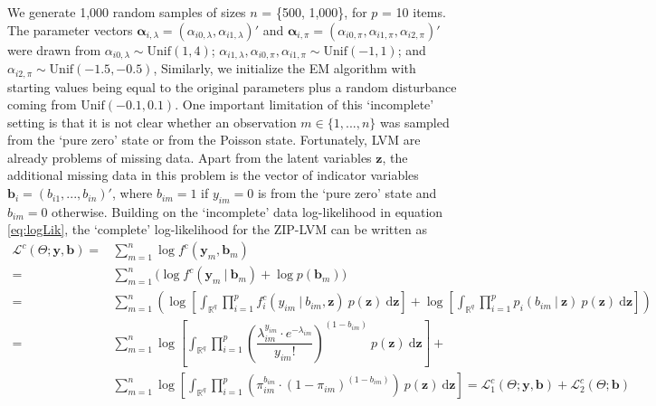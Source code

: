 \documentclass[11pt, a4paper]{article}
\newcommand{\R}{{\ensuremath{\mathbb{R}}}}
\newcommand{\cond}{\!~|~\!}
\begin{document}
We generate 1,000 random samples of sizes $n$ = \{500, 1,000\}, for $p$ = 10 items. The parameter vectors  $\bm{\alpha}_{i,\lambda} = (\alpha_{i0,\lambda}, \alpha_{i1,\lambda})'$ and  $\bm{\alpha}_{i,\pi} = (\alpha_{i0,\pi}, \alpha_{i1,\pi}, \alpha_{i2,\pi})'$ were drawn from $\alpha_{i0,\lambda} \sim \text{Unif}(1,4)$; $\alpha_{i1,\lambda}, \alpha_{i0,\pi}, \alpha_{i1,\pi} \sim \text{Unif}(-1,1)$; and $\alpha_{i2,\pi} \sim \text{Unif}(-1.5,-0.5)$, Similarly, we initialize the EM algorithm with starting values being equal to the original parameters plus a random disturbance coming from $\text{Unif}(-0.1,0.1)$. One important limitation of this `incomplete' setting is that it is not clear whether an observation $m \in \{1,...,n\}$ was sampled from the `pure zero' state or from the Poisson state. Fortunately, LVM are already problems of missing data. Apart from the latent variables $\mathbf{z}$, the additional missing data in this problem is the vector of indicator variables $\mathbf{b}_i = (b_{i1},...,b_{in})'$, where $b_{im} = 1$ if $y_{im}= 0$ is from the `pure zero' state and $b_{im} = 0$ otherwise. Building on the `incomplete' data log-likelihood in equation \eqref{eq:logLik}, the `complete' log-likelihood for the ZIP-LVM can be written as
\begin{align*}
\mathcal{L}^c(\Theta; \mathbf{y}, \mathbf{b}) = & \sum\limits_{m=1}^n \log f^\text{c}(\mathbf{y}_m, \mathbf{b}_m) \\
= & \sum\limits_{m=1}^n \Big( \log f^c(\mathbf{y}_m \cond \mathbf{b}_m) + \log p(\mathbf{b}_m) \Big) \\
= & \sum\limits_{m=1}^n \left( \log \left[ \int_{\R^q} \prod\limits_{i=1}^p f^c_i(y_{im} \cond b_{im}, \mathbf{z}) ~ p(\mathbf{z}) ~ \text{d}\mathbf{z} \right] + \log \left[ \int_{\R^q} \prod\limits_{i=1}^p p_i(b_{im} \cond \mathbf{z}) ~ p(\mathbf{z}) ~ \text{d}\mathbf{z} \right] \right) \\
= & \sum\limits_{m=1}^n \log \left[ \int_{\R^q} \prod\limits_{i=1}^p \left(\dfrac{\lambda_{im}^{y_{im}} \cdot e^{-\lambda_{im}}}{y_{im}!}\right)^{(1-b_{im})} ~ p(\mathbf{z}) ~ \text{d}\mathbf{z} \right] + \\
& \sum\limits_{m=1}^n \log \left[ \int_{\R^q} \prod\limits_{i=1}^p \left(\pi_{im}^{b_{im}} \cdot (1-\pi_{im})^{(1-b_{im})}\right) ~ p(\mathbf{z}) ~ \text{d}\mathbf{z} \right] =  \mathcal{L}^c_1(\Theta; \mathbf{y}, \mathbf{b}) + \mathcal{L}^c_2(\Theta; \mathbf{b}) %
\end{align*}
\end{document}
